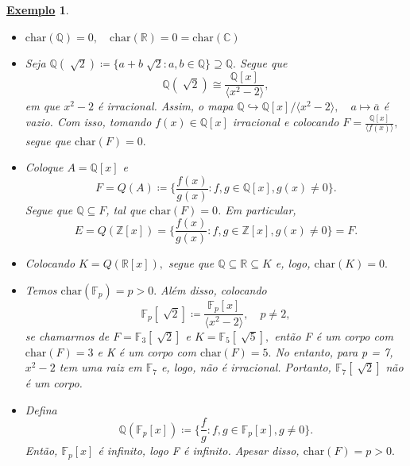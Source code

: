 \documentclass{article}
\newtheorem{example}{\underline{Exemplo}}
\begin{document}
    \begin{example}
      \begin{itemize}
        \item[1)] \(\mathrm{char}(\mathbb{Q}) = 0,\quad \mathrm{char}(\mathbb{R})=0 = \mathrm{char}(\mathbb{C})\)
        \item[2)] Seja \(\mathbb{Q}(\sqrt[]{2})\coloneqq \{a + b\sqrt[]{2}: a, b\in \mathbb{Q}\}\supseteq{\mathbb{Q}}.\) Segue que 
          \[
            \mathbb{Q}(\sqrt[]{2})\cong{\frac{\mathbb{Q}[x]}{\langle x^{2}-2 \rangle}},
          \]
          em que \(x^{2}-2\) é irracional. Assim, o mapa \(\mathbb{Q}\hookrightarrow \mathbb{Q}[x]/\langle x^{2}-2 \rangle,\quad a\mapsto \overline{a}\) é vazio.
          Com isso, tomando \(f(x)\in \mathbb{Q}[x]\) irracional e colocando \(F = \frac{\mathbb{Q}[x]}{\langle f(x) \rangle},\)
          segue que \(\mathrm{char}(F) = 0.\)
        \item[3)] Coloque \(A = \mathbb{Q}[x]\) e
          \[
            F = Q(A)\coloneqq \biggl\{\frac{f(x)}{g(x)}: f, g\in \mathbb{Q}[x], g(x)\neq0\biggr\}.
          \]
          Segue que \(\mathbb{Q}\subseteq{F}\), tal que \(\mathrm{char}(F) = 0\). Em particular, 
          \[
            E = Q(\mathbb{Z}[x]) = \biggl\{\frac{f(x)}{g(x)}:f, g\in \mathbb{Z}[x], g(x)\neq0\biggr\} = F.
          \]
        \item[4)] Colocando \(K = Q(\mathbb{R}[x]),\) segue que \(\mathbb{Q} \subseteq{\mathbb{R}}\subseteq{K}\) e, logo, \(\mathrm{char}(K) = 0.\)
        \item[5)] Temos \(\mathrm{char}(\mathbb{F}_{p}) = p > 0.\) Além disso, colocando 
          \[
            \mathbb{F}_{p}[\sqrt[]{2}]\coloneqq \frac{\mathbb{F}_{p}[x]}{\langle x^{2}-2 \rangle},\quad p\neq2,
          \]
          se chamarmos de \(F = \mathbb{F}_{3}[\sqrt[]{2}]\) e \(K = \mathbb{F}_{5}[\sqrt[]{5}],\) então
          F é um corpo com \(\mathrm{char}(F) = 3\) e K é um corpo com \(\mathrm{char}(F) = 5.\) No entanto, para p = 7,
          \(x^{2}-2\) tem uma raiz em \(\mathbb{F}_{7}\) e, logo, não é irracional. Portanto, \(\mathbb{F}_{7}[\sqrt[]{2}]\) não é um
          corpo.
        \item[6)] Defina 
          \[
            \mathbb{Q}(\mathbb{F}_{p}[x])\coloneqq \biggl\{\frac{f}{g}: f, g\in \mathbb{F}_{p}[x], g\neq 0\biggr\}.
          \]
          Então, \(\mathbb{F}_{p}[x]\) é infinito, logo F é infinito. Apesar disso, \(\mathrm{char}(F) = p > 0.\)
      \end{itemize}
    \end{example}
\end{document}
